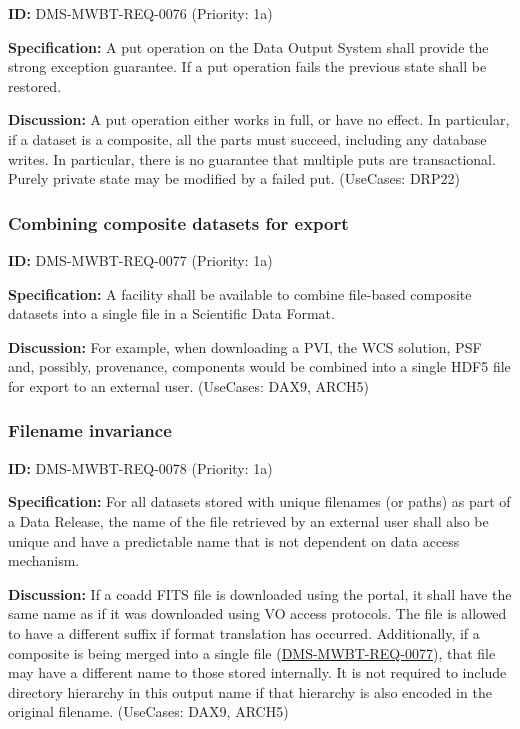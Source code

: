 \documentclass[SE,toc,lsstdraft]{lsstdoc}
\begin{document}
\label{DMS-MWBT-REQ-0076}
\textbf{ID:} DMS-MWBT-REQ-0076 (Priority: 1a)

\textbf{Specification:}
A put operation on the Data Output System shall provide the strong exception guarantee. If a put operation fails the previous state shall be restored.

\textbf{Discussion:}
A put operation either works in full, or have no effect. In particular, if a dataset is a composite, all the parts must succeed, including any database writes. In particular, there is no guarantee that multiple puts are transactional.  Purely private state may be modified by a failed put. (UseCases: DRP22)

\subsubsection{Combining composite datasets for export}

\label{DMS-MWBT-REQ-0077}
\textbf{ID:} DMS-MWBT-REQ-0077 (Priority: 1a)

\textbf{Specification:}
A facility shall be available to combine file-based composite datasets into a single file in a Scientific Data Format.

\textbf{Discussion:}
For example, when downloading a PVI, the WCS solution, PSF and, possibly, provenance, components would be combined into a single HDF5 file for export to an external user. (UseCases: DAX9, ARCH5)

\subsubsection{Filename invariance}

\label{DMS-MWBT-REQ-0078}
\textbf{ID:} DMS-MWBT-REQ-0078 (Priority: 1a)

\textbf{Specification:}
For all datasets stored with unique filenames (or paths) as part of a Data Release, the name of the file retrieved by an external user shall also be unique and have a predictable name that is not dependent on data access mechanism.

\textbf{Discussion:}
If a coadd FITS file is downloaded using the portal, it shall have the same name as if it was downloaded using VO access protocols. The file is allowed to have a different suffix if format translation has occurred. Additionally, if a composite is being merged into a single file (\hyperref[DMS-MWBT-REQ-0077]{DMS-MWBT-REQ-0077}), that file may have a different name to those stored internally. It is not required to include directory hierarchy in this output name if that hierarchy is also encoded in the original filename. (UseCases: DAX9, ARCH5)
\end{document}
